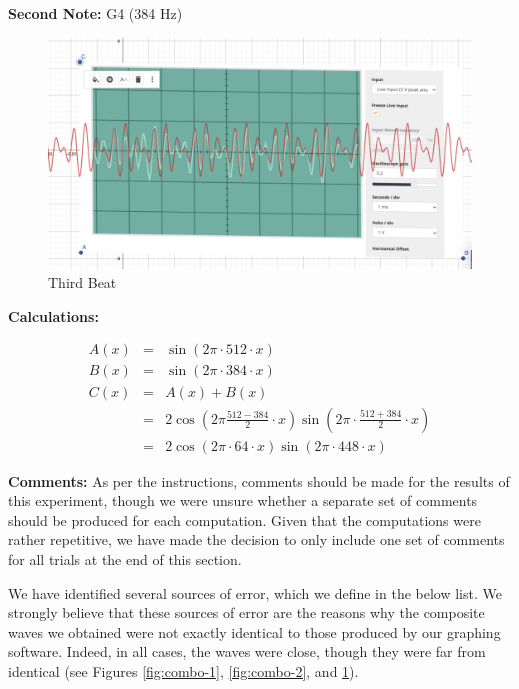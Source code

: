 \documentclass[12pt,oneside]{article}
\begin{document}
\begin{enumerate}
\textbf{Second Note:} G4 (384 Hz)

\begin{figure}[H]

{\centering \includegraphics[width=15cm,]{./images/candg} 

}

\caption{Third Beat}\label{fig:combo-3}
\end{figure}

\textbf{Calculations:}

\begin{eqnarray}
  A(x) & = & \sin (2\pi\cdot 512 \cdot x) \\
  B(x) & = & \sin (2\pi\cdot 384\cdot x) \\
  C(x) & = & A(x) + B(x) \\
       & = & 2\cos\left(2\pi\frac{512-384}{2}\cdot x\right)\sin\left(2\pi\cdot\frac{512+384}{2}\cdot x\right) \\ 
       & = & 2\cos\left(2\pi\cdot64\cdot x\right)\sin\left(2\pi\cdot 448\cdot x\right)
\end{eqnarray}

\color{black}
\end{enumerate}
\color{red}

\textbf{Comments:} As per the instructions, comments should be made for
the results of this experiment, though we were unsure whether a separate
set of comments should be produced for each computation. Given that the
computations were rather repetitive, we have made the decision to only
include one set of comments for all trials at the end of this section.

\par

We have identified several sources of error, which we define in the
below list. We strongly believe that these sources of error are the
reasons why the composite waves we obtained were not exactly identical
to those produced by our graphing software. Indeed, in all cases, the
waves were close, though they were far from identical (see Figures
\ref{fig:combo-1}, \ref{fig:combo-2}, and \ref{fig:combo-3}).
\end{document}
